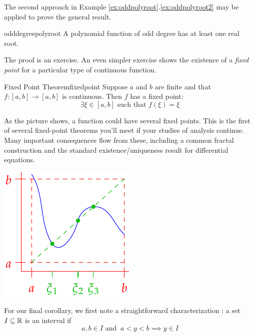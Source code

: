 The second approach in Example \ref*{ex:oddpolyroot}.\ref{ex:oddpolyroot2} may be applied to prove the general result.

\begin{cor}{}{odddegreepolyroot}
	A polynomial function of odd degree has at least one real root.
\end{cor}


The proof is an exercise. An even simpler exercise shows the existence of a \emph{fixed point} for a particular type of continuous function. 


\begin{cor}{Fixed Point Theorem}{fixedpoint}
	Suppose $a$ and $b$ are finite and that $f:[a,b]\to [a,b]$ is continuous. Then $f$ has a fixed point:
	\[\exists\xi\in[a,b]\text{ such that }f(\xi)=\xi\]
\end{cor}

\begin{minipage}[t]{0.7\linewidth}\vspace{0pt}
	As the picture shows, a function could have several fixed points.\smallbreak
	This is the first of several fixed-point theorems you'll meet if your studies of analysis continue. Many important consequences flow from these, including a common fractal construction and the standard existence/uniqueness result for differential equations. 
\end{minipage}
\hfill
\begin{minipage}[t]{0.29\linewidth}\vspace{0pt}
	\flushright\includegraphics[scale=0.95]{intval3}
\end{minipage}


\goodbreak

For our final corollary, we first note a straightforward characterization%
: a set $I\subseteq\mathbb{R}$ is an interval if
\[a,b\in I \text{ and }\ a<y<b\implies y\in I\tag{$\ast$}\]

